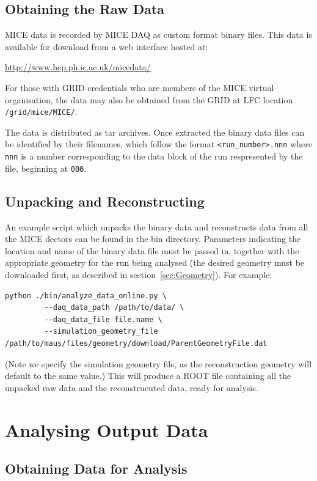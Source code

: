 \documentclass[a4paper,10pt]{article}
\begin{document}
  \subsection{Obtaining the Raw Data}
    MICE data is recorded by MICE DAQ as custom format binary files.  This data is available for download from a web interface hosted at:

    \medskip
    \url{http://www.hep.ph.ic.ac.uk/micedata/}
    \medskip

    For those with GRID credentials who are members of the MICE virtual organisation, the data may also be obtained from the GRID at LFC location \texttt{/grid/mice/MICE/}.

    The data is distributed as tar archives. Once extracted the binary data files can be identified by their filenames, which follow the format \texttt{<run\_number>.nnn} where \texttt{nnn} is a number corresponding to the data block of the run respresented by the file, beginning at \texttt{000}.

  \subsection{Unpacking and Reconstructing}
    An example script which unpacks the binary data and reconstructs data from all the MICE dectors can be found in the bin directory.  Parameters indicating the location and name of the binary data file must be passed in, together with the appropriate geometry for the run being analysed (the desired geometry must be downloaded first, as described in section~\ref{sec:Geometry}).  For example:
    \begin{lstlisting}
python ./bin/analyze_data_online.py \
         --daq_data_path /path/to/data/ \
         --daq_data_file file.name \
         --simulation_geometry_file /path/to/maus/files/geometry/download/ParentGeometryFile.dat
    \end{lstlisting}
    (Note we specify the simulation geometry file, as the reconstruction geometry will default to the same value.) This will produce a ROOT file containing all the unpacked raw data and the reconstrucuted data, ready for analysis.

\section{Analysing Output Data}
\label{sec:Analysis}

  \subsection{Obtaining Data for Analysis}
\end{document}
